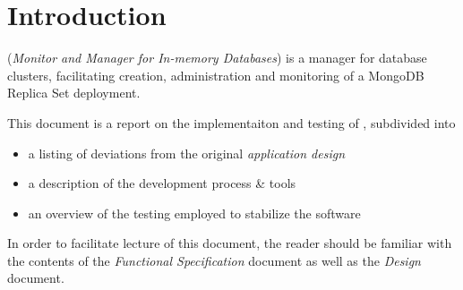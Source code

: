\section{Introduction}

\mamid (\emph{Monitor and Manager for In-memory Databases}) is a manager for database clusters, facilitating creation,
administration and monitoring of a MongoDB Replica Set deployment.

This document is a report on the implementaiton and testing of \mamid, subdivided into

\begin{itemize}
        \item a listing of deviations from the original \emph{application design}
        \item a description of the development process \& tools
        \item an overview of the testing employed to stabilize the software %
\end{itemize}

In order to facilitate lecture of this document, the reader should be familiar with the contents of the \emph{Functional Specification}
document as well as the \emph{Design} document.

